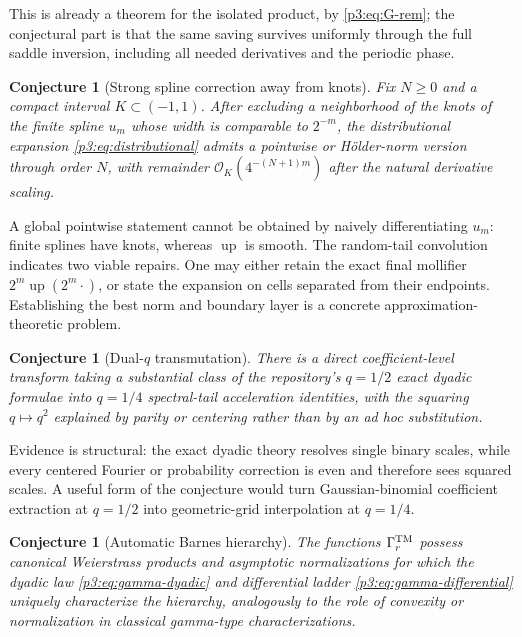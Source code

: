 \documentclass[11pt,oneside]{article}
\numberwithin{equation}{section}
\newtheorem{conjecture}[theorem]{Conjecture}
\theoremstyle{definition}
\theoremstyle{remark}
\newcommand{\Up}{\operatorname{up}}
\newcommand{\bigO}{\mathcal O}
\begin{document}
This is already a theorem for the isolated product, by \eqref{p3:eq:G-rem}; the conjectural part
is that the same saving survives uniformly through the full saddle inversion, including all
needed derivatives and the periodic phase.

\begin{conjecture}[Strong spline correction away from knots]
\label{p3:conj:strong-spline}
Fix $N\ge0$ and a compact interval $K\subset(-1,1)$.  After excluding a neighborhood of the
knots of the finite spline $u_m$ whose width is comparable to $2^{-m}$, the distributional
expansion \eqref{p3:eq:distributional} admits a pointwise or Hölder-norm version through order
$N$, with remainder $\bigO_K(4^{-(N+1)m})$ after the natural derivative scaling.
\end{conjecture}

A global pointwise statement cannot be obtained by naively differentiating $u_m$: finite
splines have knots, whereas $\Up$ is smooth.  The random-tail convolution indicates two viable
repairs.  One may either retain the exact final mollifier $2^m\Up(2^m\cdot)$, or state the
expansion on cells separated from their endpoints.  Establishing the best norm and boundary
layer is a concrete approximation-theoretic problem.

\begin{conjecture}[Dual-$q$ transmutation]
\label{p3:conj:dual-q}
There is a direct coefficient-level transform taking a substantial class of the repository's
$q=1/2$ exact dyadic formulae into $q=1/4$ spectral-tail acceleration identities, with the
squaring $q\mapsto q^2$ explained by parity or centering rather than by an ad hoc substitution.
\end{conjecture}

Evidence is structural: the exact dyadic theory resolves single binary scales, while every
centered Fourier or probability correction is even and therefore sees squared scales.  A
useful form of the conjecture would turn Gaussian-binomial coefficient extraction at
$q=1/2$ into geometric-grid interpolation at $q=1/4$.

\begin{conjecture}[Automatic Barnes hierarchy]
\label{p3:conj:automatic-Barnes}
The functions $\Gamma_r^{\rm TM}$ possess canonical Weierstrass products and asymptotic
normalizations for which the dyadic law \eqref{p3:eq:gamma-dyadic} and differential ladder
\eqref{p3:eq:gamma-differential} uniquely characterize the hierarchy, analogously to the role of
convexity or normalization in classical gamma-type characterizations.
\end{conjecture}
\end{document}
